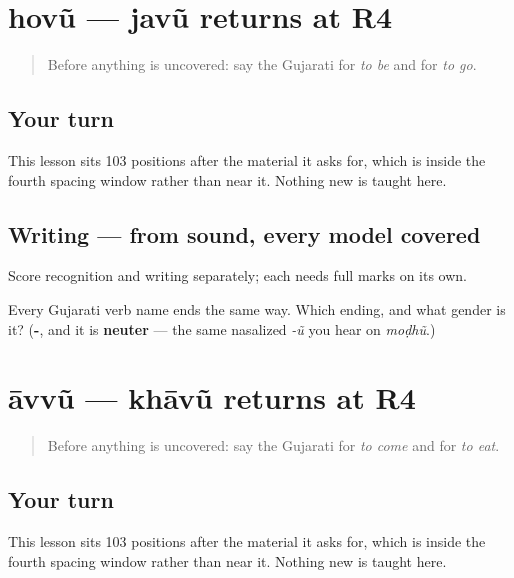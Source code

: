\section[Practice]{hovũ — javũ returns at R4}

\label{lesson:GU-R26-hovun-javun-r4}



\begin{quote}
Before anything is uncovered: say the Gujarati for \emph{to be} and for \emph{to go}.
\end{quote}

\subsection*{Your turn}
This lesson sits 103 positions after the material it asks for, which is inside the fourth spacing window rather than near it. Nothing new is taught here.

\subsection*{Writing — from sound, every model covered}
Score recognition and writing separately; each needs full marks on its own.

\begin{tcolorbox}[breakable,colback=teal!4,colframe=teal!35!black,title={Before you move on}]
Every Gujarati verb name ends the same way. Which ending, and what gender is it? (\textbf{-}, and it is \textbf{neuter} — the same nasalized \emph{-ũ} you hear on \emph{moḍhũ}.)
\end{tcolorbox}
\section[Practice]{āvvũ — khāvũ returns at R4}

\label{lesson:GU-R26-aavvun-khaavun-r4}



\begin{quote}
Before anything is uncovered: say the Gujarati for \emph{to come} and for \emph{to eat}.
\end{quote}

\subsection*{Your turn}
This lesson sits 103 positions after the material it asks for, which is inside the fourth spacing window rather than near it. Nothing new is taught here.

